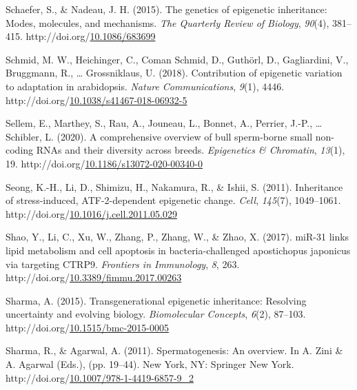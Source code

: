 \documentclass[12pt,twoside]{reedthesis}
\newlength{\cslhangindent}
\newenvironment{CSLReferences}[2] %
 {%
  \setlength{\parindent}{0pt}
  \ifodd #1 \everypar{\setlength{\hangindent}{\cslhangindent}}\ignorespaces\fi
  \ifnum #2 > 0
  \setlength{\parskip}{#2\baselineskip}
  \fi
 }%
 {}
\begin{document}
\begin{CSLReferences}{1}{0}
\leavevmode{}%
Schaefer, S., \& Nadeau, J. H. (2015). The genetics of epigenetic inheritance: Modes, molecules, and mechanisms. \emph{The Quarterly Review of Biology}, \emph{90}(4), 381--415. http://doi.org/\href{https://doi.org/10.1086/683699}{10.1086/683699}

\leavevmode{}%
Schmid, M. W., Heichinger, C., Coman Schmid, D., Guthörl, D., Gagliardini, V., Bruggmann, R., \ldots{} Grossniklaus, U. (2018). Contribution of epigenetic variation to adaptation in arabidopsis. \emph{Nature Communications}, \emph{9}(1), 4446. http://doi.org/\href{https://doi.org/10.1038/s41467-018-06932-5}{10.1038/s41467-018-06932-5}

\leavevmode{}%
Sellem, E., Marthey, S., Rau, A., Jouneau, L., Bonnet, A., Perrier, J.-P., \ldots{} Schibler, L. (2020). A comprehensive overview of bull sperm-borne small non-coding {RNAs} and their diversity across breeds. \emph{Epigenetics \& Chromatin}, \emph{13}(1), 19. http://doi.org/\href{https://doi.org/10.1186/s13072-020-00340-0}{10.1186/s13072-020-00340-0}

\leavevmode{}%
Seong, K.-H., Li, D., Shimizu, H., Nakamura, R., \& Ishii, S. (2011). Inheritance of stress-induced, ATF-2-dependent epigenetic change. \emph{Cell}, \emph{145}(7), 1049--1061. http://doi.org/\href{https://doi.org/10.1016/j.cell.2011.05.029}{10.1016/j.cell.2011.05.029}

\leavevmode{}%
Shao, Y., Li, C., Xu, W., Zhang, P., Zhang, W., \& Zhao, X. (2017). {miR}-31 links lipid metabolism and cell apoptosis in bacteria-challenged apostichopus japonicus via targeting {CTRP9}. \emph{Frontiers in Immunology}, \emph{8}, 263. http://doi.org/\href{https://doi.org/10.3389/fimmu.2017.00263}{10.3389/fimmu.2017.00263}

\leavevmode{}%
Sharma, A. (2015). Transgenerational epigenetic inheritance: Resolving uncertainty and evolving biology. \emph{Biomolecular Concepts}, \emph{6}(2), 87--103. http://doi.org/\href{https://doi.org/10.1515/bmc-2015-0005}{10.1515/bmc-2015-0005}

\leavevmode{}%
Sharma, R., \& Agarwal, A. (2011). Spermatogenesis: An overview. In A. Zini \& A. Agarwal (Eds.), (pp. 19--44). New York, NY: Springer New York. http://doi.org/\href{https://doi.org/10.1007/978-1-4419-6857-9_2}{10.1007/978-1-4419-6857-9\_2}


\end{CSLReferences}
\end{document}
